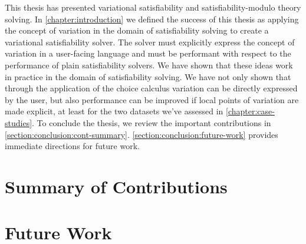 \label{chapter:conclusion}
%
This thesis has presented variational satisfiability and satisfiability-modulo
theory solving. In \autoref{chapter:introduction} we defined the success of this
thesis as applying the concept of variation in the domain of satisfiability
solving to create a variational satisfiability solver. The solver must
explicitly express the concept of variation in a user-facing language and must
be performant with respect to the performance of plain satisfiability solvers.
We have shown that these ideas work in practice in the domain of satisfiability
solving. We have not only shown that through the application of the choice
calculus variation can be directly expressed by the user, but also performance
can be improved if local points of variation are made explicit, at least for the
two datasets we've assessed in \autoref{chapter:case-studies}.
%
To conclude the thesis, we review the important contributions in
\autoref{section:conclusion:cont-summary}.
\autoref{section:conclusion:future-work} provides immediate directions for
future work.

\section{Summary of Contributions}

%
\section{Future Work}

%




